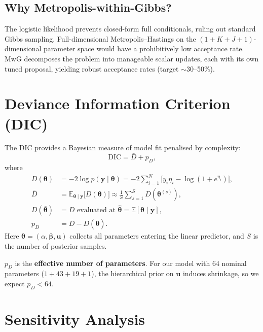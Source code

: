 \documentclass[11pt]{article}
\newcommand{\by}{\bm{y}}
\newcommand{\bbeta}{\bm{\beta}}
\newcommand{\bu}{\bm{u}}
\newcommand{\btheta}{\bm{\theta}}
\begin{document}
\subsection{Why Metropolis-within-Gibbs?}

The logistic likelihood prevents closed-form full conditionals, ruling
out standard Gibbs sampling. Full-dimensional Metropolis--Hastings on
the $(1 + K + J + 1)$-dimensional parameter space would have a
prohibitively low acceptance rate. MwG decomposes the problem into
manageable scalar updates, each with its own tuned proposal,
yielding robust acceptance rates (target $\sim$30--50\%).

\section{Deviance Information Criterion (DIC)}
\label{sec:dic}

The DIC provides a Bayesian measure of model fit penalised by complexity:
\begin{equation}
  \text{DIC} = \bar{D} + p_D,
\end{equation}
where
\begin{align}
  D(\btheta) &= -2\log p(\by \mid \btheta)
    = -2\sum_{i=1}^{N}\bigl[y_i\eta_i - \log(1+e^{\eta_i})\bigr], \label{eq:deviance}\\
  \bar{D} &= \mathbb{E}_{\btheta\mid\by}\bigl[D(\btheta)\bigr]
    \approx \frac{1}{S}\sum_{s=1}^{S}D(\btheta^{(s)}), \label{eq:dbar}\\
  D(\bar{\btheta}) &= D\text{ evaluated at }\hat{\btheta} = \mathbb{E}[\btheta\mid\by], \label{eq:dthetabar}\\
  p_D &= \bar{D} - D(\bar{\btheta}). \label{eq:pd}
\end{align}
Here $\btheta = (\alpha, \bbeta, \bu)$ collects all parameters entering
the linear predictor, and $S$ is the number of posterior samples.

$p_D$ is the \textbf{effective number of parameters}. For our model
with 64 nominal parameters ($1 + 43 + 19 + 1$), the hierarchical prior
on $\bu$ induces shrinkage, so we expect $p_D < 64$.

\section{Sensitivity Analysis}
\label{sec:sensitivity}
\end{document}
